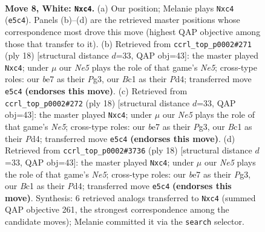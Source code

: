 \documentclass[11pt]{article}
\begin{document}
\begin{figure}[p]\centering
\begin{subfigure}{0.46\textwidth}\centering
\resizebox{\linewidth}{!}{%
\newchessgame
\chessboard[
  setfen={rnbq1rk1/ppp1bppp/4p3/3nN3/2pP4/6P1/PP2PPBP/RNBQ1RK1 w - - 2 8},
  showmover=false,
  pgfstyle=straightmove, color=movearrow, markmove={e5-c4}
]}
\caption{}
\end{subfigure}\hfill
\begin{subfigure}{0.46\textwidth}\centering
\resizebox{\linewidth}{!}{%
\newchessgame
\chessboard[
  setfen={rnbq1rk1/pp2bppp/2p1p3/3nN3/2pP1B2/6P1/PP2PPBP/RN1Q1RK1 w - - 2 10},
  showmover=false,
  pgfstyle=straightmove, color=movearrow, markmove={e5-c4}
]}
\caption{}
\end{subfigure}
\\[4pt]
\begin{subfigure}{0.46\textwidth}\centering
\resizebox{\linewidth}{!}{%
\newchessgame
\chessboard[
  setfen={rnbq1rk1/pp2bppp/2p1p3/3nN3/2pP1B2/6P1/PP2PPBP/RN1Q1RK1 w - - 2 10},
  showmover=false,
  pgfstyle=straightmove, color=movearrow, markmove={e5-c4}
]}
\caption{}
\end{subfigure}\hfill
\begin{subfigure}{0.46\textwidth}\centering
\resizebox{\linewidth}{!}{%
\newchessgame
\chessboard[
  setfen={rnbq1rk1/pp2bppp/2p1p3/3nN3/2pP1B2/6P1/PP2PPBP/RN1Q1RK1 w - - 2 10},
  showmover=false,
  pgfstyle=straightmove, color=movearrow, markmove={e5-c4}
]}
\caption{}
\end{subfigure}
\caption{\textbf{Move 8, White: \texttt{Nxc4}.} (a) Our position; Melanie plays \texttt{Nxc4} (\texttt{e5c4}). Panels (b)--(d) are the retrieved master positions whose correspondence most drove this move (highest QAP objective among those that transfer to it). (b) Retrieved from \texttt{ccrl\_top\_p0002\#271} (ply 18) [structural distance $d$=33, QAP obj=43]: the master played \texttt{Nxc4}; under $\mu$ our \emph{Ne5} plays the role of that game's \emph{Ne5}; cross-type roles: our \emph{b}e7 as their \emph{P}g3, our \emph{B}c1 as their \emph{P}d4; transferred move \texttt{e5c4} \textbf{(endorses this move)}. (c) Retrieved from \texttt{ccrl\_top\_p0002\#272} (ply 18) [structural distance $d$=33, QAP obj=43]: the master played \texttt{Nxc4}; under $\mu$ our \emph{Ne5} plays the role of that game's \emph{Ne5}; cross-type roles: our \emph{b}e7 as their \emph{P}g3, our \emph{B}c1 as their \emph{P}d4; transferred move \texttt{e5c4} \textbf{(endorses this move)}. (d) Retrieved from \texttt{ccrl\_top\_p0002\#3736} (ply 18) [structural distance $d$=33, QAP obj=43]: the master played \texttt{Nxc4}; under $\mu$ our \emph{Ne5} plays the role of that game's \emph{Ne5}; cross-type roles: our \emph{b}e7 as their \emph{P}g3, our \emph{B}c1 as their \emph{P}d4; transferred move \texttt{e5c4} \textbf{(endorses this move)}. Synthesis: 6 retrieved analogs transferred to \texttt{Nxc4} (summed QAP objective 261, the strongest correspondence among the candidate moves); Melanie committed it via the \texttt{search} selector.}
\label{fig:thought-m14}
\end{figure}
\end{document}
